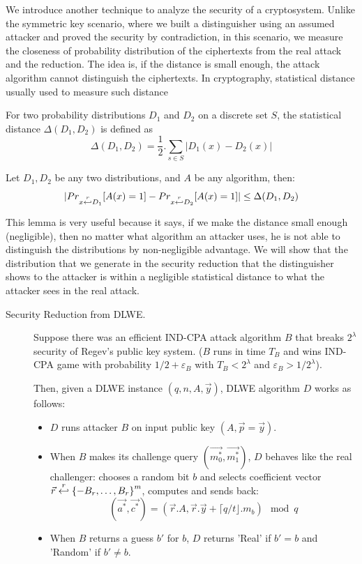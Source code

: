 \begin{description}
  We introduce another technique to analyze the security of a
  cryptosystem. Unlike the symmetric key scenario, where we built a
  distinguisher using an assumed attacker and proved the security by
  contradiction, in this scenario, we measure the closeness of probability
  distribution of the ciphertexts from the real attack and the reduction. The
  idea is, if the distance is small enough, the attack algorithm cannot
  distinguish the ciphertexts. In cryptography, statistical distance usually
  used to measure such distance
  \begin{definition}
     For two probability distributions $D_1$ and $D_2$ on
    a discrete set $S$, the statistical distance $\Delta(D_1,D_2)$ is defined as
    \[
      \Delta(D_1, D_2) = \frac{1}{2}. \sum_{s \in S}|D_1(x) - D_2(x)|
    \]
    \label{def:statisticalDistance}
  \end{definition}
  \begin{lemma}
    Let $D_1, D_2$ be any two distributions, and $A$ be any algorithm, then:
    \[
      |Pr_{x\stackrel{r}{\hookleftarrow} D_1}[A(x) = 1] - Pr_{x\stackrel{r}{\hookleftarrow} D_2}[A(x) = 1]|
      \leq \Delta(D_1, D_2)
    \]
    \label{lem:statisticalDistance}
  \end{lemma}
  This lemma is very useful because it says, if we make the distance small
  enough (negligible), then no matter what algorithm an attacker uses, he is not
  able to distinguish the distributions by non-negligible advantage. We will
  show that the distribution that we generate in the security reduction that the
  distinguisher shows to the attacker is within a negligible statistical
  distance to what the attacker sees in the real attack.

  \begin{description}
  \item[Security Reduction from DLWE.] Suppose there was an efficient IND-CPA
    attack algorithm $B$ that breaks $2^\lambda$ security of Regev's public key
    system. ($B$ runs in time $T_B$ and wins IND-CPA game with probability
    $1/2 + \varepsilon_B$ with $T_B < 2^\lambda$ and
    $\varepsilon_B > 1/2^\lambda$).

    Then, given a DLWE instance $(q,n,A,\vec{y})$, DLWE algorithm $D$ works as
    follows:
    \begin{itemize}
    \item $D$ runs attacker $B$ on input public key $(A, \vec{p} = \vec{y})$.
    \item When $B$ makes its challenge query $(\vec{m_0^*}, \vec{m_1^*})$, $D$
      behaves like the real challenger: chooses a random bit $b$ and selects
      coefficient vector
      $\vec{r} \stackrel{r}{\hookleftarrow} \left\{ -B_r, \dots, B_r \right\}^m$, computes and
      sends back:
      \[
        (\vec{a^*}, \vec{c^*}) = (\vec{r}.A, \vec{r}.\vec{y} + \lceil q/t
        \rfloor .  m_b) \mod q
      \]
    \item When $B$ returns a guess $b'$ for $b$, $D$ returns 'Real' if $b'=b$
      and 'Random' if $b' \neq b$.
    \end{itemize}


\end{description}
\end{description}

